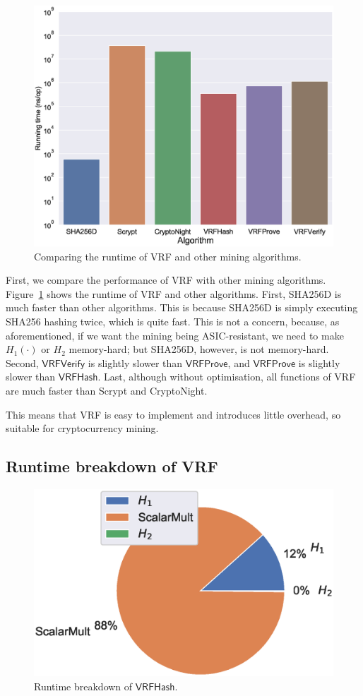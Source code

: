 \begin{figure}[htp]
    \centering
    \includegraphics[width=.7\linewidth]{figs/runtime-comparison.eps}
    \caption{Comparing the runtime of VRF and other mining algorithms.}
    \label{fig:runtime-comparison}
\end{figure}

First, we compare the performance of VRF with other mining algorithms.
Figure~\ref{fig:runtime-comparison} shows the runtime of VRF and other algorithms.
First, SHA256D is much faster than other algorithms.
This is because SHA256D is simply executing SHA256 hashing twice, which is quite fast.
This is not a concern, because,
as aforementioned, if we want the mining being ASIC-resistant, we need to make $H_{1}(\cdot)$ or $H_{2}$ memory-hard; but SHA256D, however, is not memory-hard.
Second, $\mathsf{VRFVerify}$ is slightly slower than $\mathsf{VRFProve}$, and $\mathsf{VRFProve}$ is slightly slower than $\mathsf{VRFHash}$.
Last, although without optimisation, all functions of VRF are much faster than Scrypt and CryptoNight.

This means that VRF is easy to implement and introduces little overhead, so suitable for cryptocurrency mining.



\subsection{Runtime breakdown of VRF}

\begin{figure}[htp]
    \centering
    \includegraphics[width=.7\linewidth]{figs/runtime-breakdown.eps}
    \caption{Runtime breakdown of $\mathsf{VRFHash}$.}
    \label{fig:runtime-breakdown}
\end{figure}


